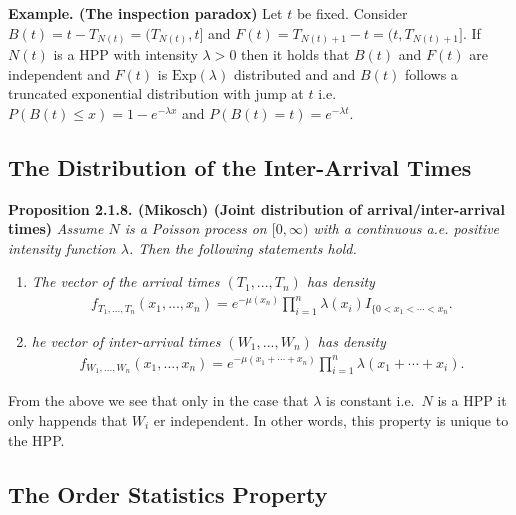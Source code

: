 \documentclass[a4paper,12pt,openany]{book}
\providecommand{\tightlist}{%
 \setlength{\itemsep}{0pt}\setlength{\parskip}{0pt}}
\begin{document}
\textbf{Example. (The inspection paradox)} Let \(t\) be fixed. Consider \(B(t)=t-T_{N(t)}=(T_{N(t)},t]\) and \(F(t)=T_{N(t)+1}-t=(t,T_{N(t)+1}]\). If \(N(t)\) is a HPP with intensity \(\lambda>0\) then it holds that \(B(t)\) and \(F(t)\) are independent and \(F(t)\) is \(\text{Exp}(\lambda)\) distributed and and \(B(t)\) follows a truncated exponential distribution with jump at \(t\) i.e.~\(P(B(t)\le x)=1-e^{-\lambda x}\) and \(P(B(t)=t)=e^{-\lambda t}\).

\hypertarget{the-distribution-of-the-inter-arrival-times}{%
\subsection{The Distribution of the Inter-Arrival Times}\label{the-distribution-of-the-inter-arrival-times}}

\textbf{Proposition 2.1.8. (Mikosch) (Joint distribution of arrival/inter-arrival times)} \emph{Assume \(N\) is a Poisson process on \([0, \infty)\) with a continuous a.e. positive intensity function \(\lambda\). Then the following statements hold.}

\begin{enumerate}
\def\labelenumi{(\arabic{enumi})}
\tightlist
\item
  \emph{The vector of the arrival times \((T_1,...,T_n)\) has density}
  \begin{align*}
    f_{T_1,...,T_n}(x_1,...,x_n)=e^{-\mu(x_n)}\prod_{i=1}^n\lambda(x_i)I_{\{0<x_1<\cdots <x_n}.
    \end{align*}
\item
  \emph{he vector of inter-arrival times \((W_1,...,W_n)\) has density}
  \begin{align*}
    f_{W_1,...,W_n}(x_1,...,x_n)=e^{-\mu(x_1+\cdots+x_n)}\prod_{i=1}^n\lambda(x_1+\cdots +x_i).
    \end{align*}
\end{enumerate}

From the above we see that only in the case that \(\lambda\) is constant i.e.~\(N\) is a HPP it only happends that \(W_i\) er independent. In other words, this property is unique to the HPP.

\hypertarget{the-order-statistics-property}{%
\subsection{The Order Statistics Property}\label{the-order-statistics-property}}
\end{document}
